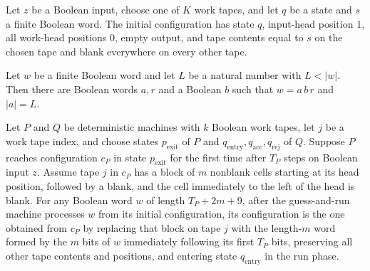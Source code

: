 \begin{definition}
\label{Turing.streamStartCfg}
\leanok
{}
Let $z$ be a Boolean input, choose one of $K$ work tapes, and let $q$ be a state and $s$
a finite Boolean word. The initial configuration has state $q$, input-head position $1$,
all work-head positions $0$, empty output, and tape contents equal to $s$ on the chosen
tape and blank everywhere on every other tape.
\end{definition}

\begin{theorem}
\label{Turing.guessRun_split}
\leanok
{}
Let $w$ be a finite Boolean word and let $L$ be a natural number with $L<|w|$. Then
there are Boolean words $a,r$ and a Boolean $b$ such that $w=a\,b\,r$ and $|a|=L$.
\end{theorem}

\begin{theorem}
\label{Turing.guessRunTM_runWith_handoff}
\leanok
{}
Let $P$ and $Q$ be deterministic machines with $k$ Boolean work tapes, let $j$ be a work
tape index, and choose states $p_{\mathrm{exit}}$ of $P$ and
$q_{\mathrm{entry}},q_{\mathrm{acc}},q_{\mathrm{rej}}$ of $Q$. Suppose $P$ reaches
configuration $c_P$ in state $p_{\mathrm{exit}}$ for the first time after $T_P$ steps on
Boolean input $z$. Assume tape $j$ in $c_P$ has a block of $m$ nonblank cells starting
at its head position, followed by a blank, and the cell immediately to the left of the
head is blank. For any Boolean word $w$ of length $T_P+2m+9$, after the guess-and-run
machine processes $w$ from its initial configuration, its configuration is the one
obtained from $c_P$ by replacing that block on tape $j$ with the length-$m$ word formed
by the $m$ bits of $w$ immediately following its first $T_P$ bits, preserving all other
tape contents and positions, and entering state $q_{\mathrm{entry}}$ in the run phase.
\end{theorem}

